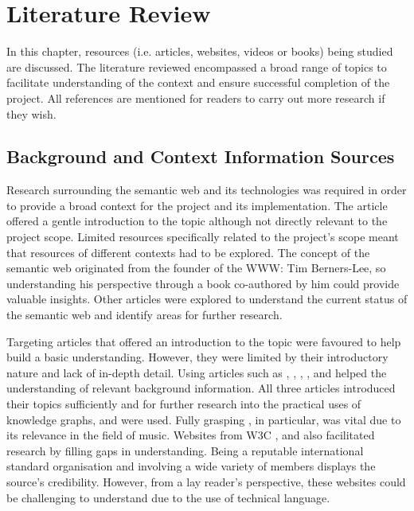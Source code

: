 \chapter{Literature Review}
In this chapter, resources (i.e. articles, websites, videos or books) being studied are discussed. The literature reviewed encompassed a broad range of topics to facilitate understanding of the context and ensure successful completion of the project. All references are mentioned for readers to carry out more research if they wish. 

\section{Background and Context Information Sources}
\hspace{0.5cm} Research surrounding the semantic web and its technologies was required in order to provide a broad context for the project and its implementation. The article \cite{semanticweb} offered a gentle introduction to the topic although not directly relevant to the project scope. Limited resources specifically related to the project's scope meant that resources of different contexts had to be explored. The concept of the semantic web originated from the founder of the WWW: Tim Berners-Lee, so understanding his perspective through a book \cite{berners-TBLBook} co-authored by him could provide valuable insights. Other articles \cite{bizer2011linked} were explored to understand the current status of the semantic web and identify areas for further research. 

Targeting articles that offered an introduction to the topic were favoured to help build a basic understanding. However, they were limited by their introductory nature and lack of in-depth detail. Using articles such as \cite{ontology}, \cite{knowledgegraph}, \cite{sikos_2015}, \cite{gottschalk2021creation}, \cite{studer_benjamins_fensel_1998} and \cite{rdf} helped the understanding of relevant background information. All three articles introduced their topics sufficiently and for further research into the practical uses of knowledge graphs, \cite{searchengine} and \cite{oramas2016sound} were used. Fully grasping \cite{oramas2016sound}, in particular, was vital due to its relevance in the field of music. Websites from W3C \cite{TTL}, \cite{w3crdf} and \cite{w3cvocabularies} also facilitated research by filling gaps in understanding. Being a reputable international standard organisation and involving a wide variety of members displays the source's credibility. However, from a lay reader's perspective, these websites could be challenging to understand due to the use of technical language.

